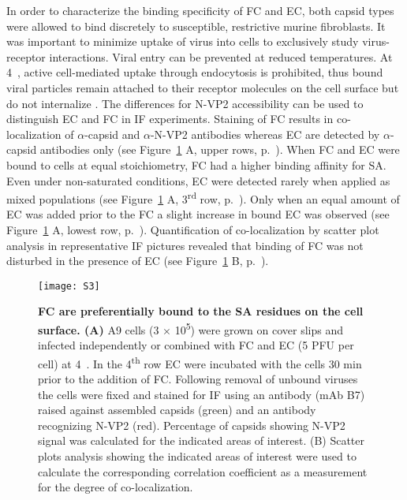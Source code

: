 In order to characterize the binding specificity of FC and EC, both capsid types were allowed to bind discretely to susceptible, restrictive murine fibroblasts. It was important to minimize uptake of virus into cells to exclusively study virus-receptor interactions. Viral entry can be prevented at reduced temperatures. At \mbox{4~\textcelsius}, active cell-mediated uptake through endocytosis is prohibited, thus bound viral particles remain attached to their receptor molecules on the cell surface but do not internalize \cite{pmid20517}. The differences for N-VP2 accessibility can be used to distinguish EC and FC in IF experiments. Staining of FC results in co-localization of $\alpha$-capsid and $\alpha$-N-VP2 antibodies whereas EC are detected by $\alpha$-capsid antibodies only (see Figure~\ref{S3} A, upper rows, p.~\pageref{S3}). When FC and EC were bound to cells at equal stoichiometry, FC had a higher binding affinity for SA. Even under non-saturated conditions, EC were detected rarely when applied as mixed populations (see Figure~\ref{S3} A, 3\textsuperscript{rd} row, p.~\pageref{S3}). Only when an equal amount of EC was added prior to the FC a slight increase in bound EC was observed (see Figure~\ref{S3} A, lowest row, p.~\pageref{S3}). Quantification of co-localization by scatter plot analysis in representative IF pictures revealed that binding of FC was not disturbed in the presence of EC (see Figure~\ref{S3} B, p.~\pageref{S3}).             








\begin{figure}
\centering
  \texttt{[image: S3]} \\[0.35 cm]
  \caption[Full Capsids are Preferentially Bound to the Sialic Acid Residues on the Cell Surface]
   {\textbf{FC are preferentially bound to the SA residues on the cell surface. (A)} A9 cells (3 $\times$ 10\textsuperscript{5}) were grown on cover slips and infected independently or combined with FC and EC (5 PFU per cell) at \mbox{4 \textcelsius}. In the 4\textsuperscript{th} row EC were incubated with the cells 30 min prior to the addition of FC. Following removal of unbound viruses the cells were fixed and stained for IF using an antibody (mAb B7) raised against assembled capsids (green) and an antibody recognizing N-VP2 (red). Percentage of capsids showing N-VP2 signal was calculated for the indicated areas of interest. (B) Scatter plots analysis showing the indicated areas of interest were used to calculate the corresponding correlation coefficient as a measurement for the degree of co-localization.} 
\label{S3}
\end{figure}



